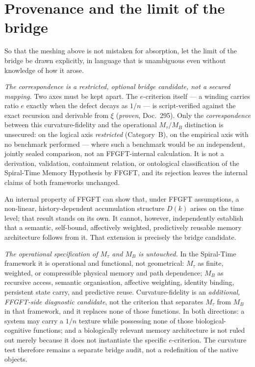 \section{Provenance and the limit of the bridge}

So that the meshing above is not mistaken for absorption, let the limit of the bridge be drawn
explicitly, in language that is unambiguous even without knowledge of how it arose.

\emph{The correspondence is a restricted, optional bridge candidate, not a secured mapping.}
Two axes must be kept apart. The $e$-criterion itself --- a winding carries ratio $e$ exactly
when the defect decays as $1/n$ --- is script-verified against the exact recursion and derivable
from $\xi$ (\emph{proven}, Doc.~295). Only the \emph{correspondence} between this
curvature-fidelity and the operational $M_\tau/M_B$ distinction is unsecured: on the logical
axis \emph{restricted} (Category~B), on the empirical axis with no benchmark performed --- where
such a benchmark would be an independent, jointly sealed comparison, not an FFGFT-internal
calculation. It is not a derivation, validation, containment relation, or ontological
classification of the Spiral-Time Memory Hypothesis by FFGFT, and its rejection leaves the
internal claims of both frameworks unchanged.

An internal property of FFGFT can show that, under FFGFT assumptions, a non-linear,
history-dependent accumulation structure $D(k)$ arises on the time level; that result stands on
its own. It cannot, however, independently establish that a semantic, self-bound, affectively
weighted, predictively reusable memory architecture follows from it. That extension is
precisely the bridge candidate.

\emph{The operational specification of $M_\tau$ and $M_B$ is untouched.} In the Spiral-Time
framework it is operational and functional, not geometrical: $M_\tau$ as finite, weighted, or
compressible physical memory and path dependence; $M_B$ as recursive access, semantic
organisation, affective weighting, identity binding, persistent state carry, and predictive
reuse. Curvature-fidelity is an \emph{additional, FFGFT-side diagnostic candidate}, not the
criterion that separates $M_\tau$ from $M_B$ in that framework, and it replaces none of those
functions. In both directions: a system may carry a $1/n$ texture while possessing none of
those biological-cognitive functions; and a biologically relevant memory architecture is not
ruled out merely because it does not instantiate the specific $e$-criterion. The curvature test
therefore remains a separate bridge audit, not a redefinition of the native objects.


